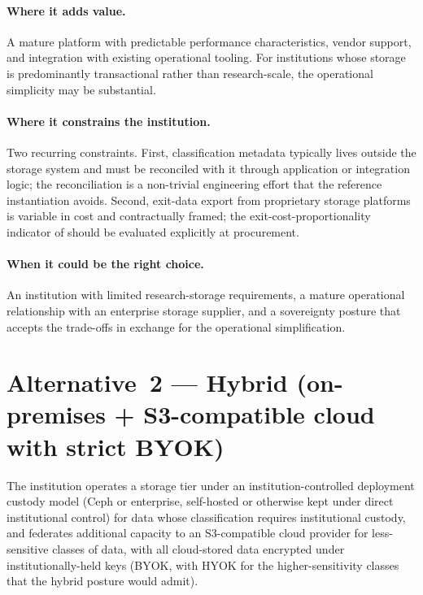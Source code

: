 \paragraph{Where it adds value.} A mature platform with predictable
performance characteristics, vendor support, and integration with
existing operational tooling. For institutions whose storage is
predominantly transactional rather than research-scale, the
operational simplicity may be substantial.

\paragraph{Where it constrains the institution.} Two recurring
constraints. First, classification metadata typically lives outside
the storage system and must be reconciled with it through
application or integration logic; the reconciliation is a
non-trivial engineering effort that the reference instantiation
avoids. Second, exit-data export from proprietary storage platforms
is variable in cost and contractually framed; the
exit-cost-proportionality indicator of
 should be evaluated explicitly at
procurement.

\paragraph{When it could be the right choice.} An institution with
limited research-storage requirements, a mature operational
relationship with an enterprise storage supplier, and a
sovereignty posture that accepts the trade-offs in exchange for
the operational simplification.

\section{Alternative~2 --- Hybrid (on-premises + S3-compatible cloud with strict BYOK)}
\label{sec:st-alt2}

\begin{alternativebox}
\noindent The institution operates a storage tier under an
institution-controlled deployment custody model (Ceph or enterprise,
self-hosted or otherwise kept under direct institutional control) for
data whose classification requires institutional custody, and
federates additional capacity to an S3-compatible cloud
provider for less-sensitive classes of data, with all cloud-stored
data encrypted under institutionally-held keys (BYOK, with HYOK for
the higher-sensitivity classes that the hybrid posture would
admit).
\end{alternativebox}

